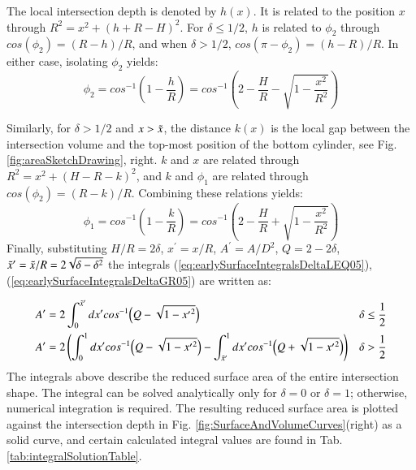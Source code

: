 \documentclass[authoryear]{elsarticle}
\begin{document}
    The local intersection depth is denoted by $h(x)$.
    It is related to the position $x$ through $R^2 = x^2 + ( h + R-H)^2$.
    For $\delta \leq 1/2$, $h$ is related to $\phi_2$ through $cos(\phi_2)=(R-h)/R$, and when $\delta > 1/2$, $cos(\pi-\phi_2) = (h-R)/R$.
    In either case, isolating $\phi_2$ yields:
    \begin{equation*}
        \phi_2 = cos^{-1} \left( 1 - \frac{h}{R}   \right) 
        = cos^{-1} \left( 2 - \frac{H}{R} - \sqrt{ 1-\frac{x^2}{R^2}  }   \right)
    \end{equation*}

    Similarly, for $\delta > 1/2$ and $x>\Tilde{x}$, the distance $k(x)$ is the local gap between the intersection volume and the top-most position of the bottom cylinder, see Fig. \ref{fig:areaSketchDrawing}, right.
    $k$ and $x$ are related through $R^2 = x^2 + ( H-R-k)^2$, and $k$ and $\phi_1$ are related through $cos(\phi_2)=(R-k)/R$.
    Combining these relations yields:
    \begin{equation*}
        \phi_1 = cos^{-1} \left( 1 - \frac{k}{R}   \right) 
        = cos^{-1} \left( 2 - \frac{H}{R} + \sqrt{ 1-\frac{x^2}{R^2}  }   \right)
    \end{equation*}
    Finally, substituting $H/R = 2\delta$, $x^\prime = x/R$, $A^\prime = A/D^2$, $Q=2-2\delta$, $\Tilde{x}^\prime= \Tilde{x}/R= 2\sqrt{\delta - \delta^2}$ the integrals (\ref{eq:earlySurfaceIntegralsDeltaLEQ05}), (\ref{eq:earlySurfaceIntegralsDeltaGR05}) are written as:
    
    \begin{align}
    A^\prime &=
      2 \int_0^{\Tilde{x}^\prime} dx^\prime cos^{-1} \Big( Q -\sqrt{ 1-{x^\prime}^2 } \Big)    
      &&\delta \leq \frac{1}{2} \label{eq:integralSurfaceSolutionDeltaLEQ05} \\
    A^\prime &=
      2 \left( \int_0^1 dx^\prime cos^{-1} \Big( Q - \sqrt{ 1-{x^\prime}^2 }\Big) - 
    \int_{\Tilde{x}^\prime}^1 dx^\prime cos^{-1} \Big( Q + \sqrt{ 1-{x^\prime}^2 }\Big) \right)
       &&\delta > \frac{1}{2} \label{eq:integralSurfaceSolutionDeltaGR05}
    \end{align}
    The integrals above describe the reduced surface area of the entire intersection shape.
    The integral can be solved analytically only for $\delta = 0$ or $\delta=1$; otherwise, numerical integration is required.
    The resulting reduced surface area is plotted against the intersection depth in Fig. \ref{fig:SurfaceAndVolumeCurves}(right) as a solid curve, and certain calculated integral values are found in Tab. \ref{tab:integralSolutionTable}.
\end{document}
